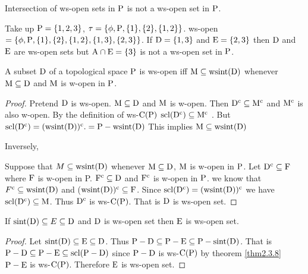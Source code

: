 \begin{rem}\label{rem2.3.4}
Intersection of ws-open sets in $\mathrm{P}$ is not a ws-open set in $\mathrm{P}$.
\end{rem}

\begin{exm}\label{exam2.3.5}
Take up $\mathrm{P} = \{1,2, 3\}$, $\tau = \{\phi, \mathrm{P}, \{1\}, \{2\}, \{1, 2\}\}$. ws-open $= \{\phi, \mathrm{P}, \{1\}, \{2\}, \{1, 2\},\{1,3\},\{2,3\}\}$. If $\mathrm{D}= \{1,3\}$ and $\mathrm{E}=\{2,3\}$ then $\mathrm{D}$ and $\mathrm{E}$ are ws-open sets but $\mathrm{A}\cap \mathrm{E}=\{3\}$ is not a ws-open set in $\mathrm{P}$.
\end{exm}

\begin{thm}\label{thm2.3.6}
A subset $\mathrm{D}$ of a topological space $\mathrm{P}$ is ws-open iff $\mathrm{M}\subseteq  \text{wsint} (\mathrm{D})$ whenever $\mathrm{M}\subseteq \mathrm{D}$ and $\mathrm{M}$ is w-open in $\mathrm{P}$.
\end{thm}

\begin{proof}
Pretend $\mathrm{D}$ is ws-open. $\mathrm{M}\subseteq \mathrm{D}$ and $\mathrm{M}$ is w-open. Then $\mathrm{D}^{\text{c}} \subseteq \mathrm{M}^{\text{c}}$ and $\mathrm{M}^{\text{c}}$ is also w-open. By
the definition of ws-$\mathrm{C}(\mathrm{P})$ $\mathrm{scl}(\mathrm{D}^{\text{c}})\subseteq \mathrm{M}^{\text{c}}$ . But $\mathrm{scl}(\mathrm{D}^{\text{c}})=(\text{wsint}(\mathrm{D}))^{\text{c}}.=\mathrm{P}-\text{wsint}(\mathrm{D})$ This implies $\mathrm{M}\subseteq \text{wsint}(\mathrm{D})$

Inversely,

Suppose that $M\subseteq  \mathrm{wsint}(\mathrm{D})$ whenever $\mathrm{M}\subseteq \mathrm{D}$, $\mathrm{M}$ is w-open in $\mathrm{P}$. Let $\mathrm{D}^{\text{c}} \subseteq \mathrm{F}$ where $\mathrm{F}$ is w-open in P. $\mathrm{F}^{\text{c}} \subseteq \mathrm{D}$ and $\mathrm{F}^{\text{c}}$ is w-open in $\mathrm{P}$. we know that $F^{\text{c}} \subseteq \mathrm{wsint}(\mathrm{D})$ and ($\mathrm{wsint}(\mathrm{D}))^{\text{c}} \subseteq \mathrm{F}$. Since $\mathrm{scl}(\mathrm{D}^{\text{c}})= (\mathrm{wsint}(\mathrm{D}))^{\text{c}}$ we have $\mathrm{scl}(\mathrm{D}^{\text{c}})\subseteq \mathrm{M}$. Thus $\mathrm{D}^{\text{c}}$ is ws-$\mathrm{C}(\mathrm{P})$. That is $\mathrm{D}$ is ws-open set.
\end{proof}

\begin{thm}\label{thm2.3.7}
If $\mathrm{sint}(\mathrm{D})\subseteq E\subseteq \mathrm{D}$ and $\mathrm{D}$ is ws-open set then $\mathrm{E}$  is ws-open set.
\end{thm}

\begin{proof}
Let $\mathrm{sint}(\mathrm{D})\subseteq \mathrm{E}\subseteq \mathrm{D}$. Thus $\mathrm{P}-\mathrm{D}\subseteq \mathrm{P}-\mathrm{E}\subseteq \mathrm{P}-\mathrm{sint}(\mathrm{D})$. That is $\mathrm{P}-\mathrm{D}\subseteq \mathrm{P}-\mathrm{E}\subseteq \mathrm{scl}(\mathrm{P}-\mathrm{D})$ since $\mathrm{P}-\mathrm{D}$ is ws-$\mathrm{C}(\mathrm{P})$ by theorem \ref{thm2.3.8} $\mathrm{P}-\mathrm{E}$ is ws-$\mathrm{C}(\mathrm{P})$. Therefore $\mathrm{E}$  is ws-open set.
\end{proof}

